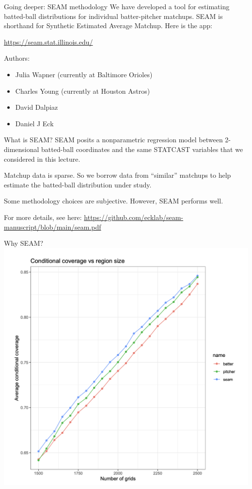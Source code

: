 \documentclass[
  ignorenonframetext,
]{beamer}
\providecommand{\tightlist}{%
  \setlength{\itemsep}{0pt}\setlength{\parskip}{0pt}}
\begin{document}
\begin{frame}{Going deeper: SEAM methodology}
\protect\hypertarget{going-deeper-seam-methodology}{}
We have developed a tool for estimating batted-ball distributions for
individual batter-pitcher matchups. SEAM is shorthand for Synthetic
Estimated Average Matchup. Here is the app:

\vspace{12pt}

\url{https://seam.stat.illinois.edu/}

\vspace{12pt}

Authors:

\begin{itemize}
\tightlist
\item
  Julia Wapner (currently at Baltimore Orioles)
\item
  Charles Young (currently at Houston Astros)
\item
  David Dalpiaz
\item
  Daniel J Eck
\end{itemize}
\end{frame}

\begin{frame}{What is SEAM?}
\protect\hypertarget{what-is-seam}{}
SEAM posits a nonparametric regression model between 2-dimensional
batted-ball coordinates and the same STATCAST variables that we
considered in this lecture.

\vspace{12pt}

Matchup data is sparse. So we borrow data from ``similar'' matchups to
help estimate the batted-ball distribution under study.

\vspace{12pt}

Some methodology choices are subjective. However, SEAM performs well.

\vspace{12pt}

For more details, see here:
\url{https://github.com/ecklab/seam-manuscript/blob/main/seam.pdf}
\end{frame}

\begin{frame}{Why SEAM?}
\protect\hypertarget{why-seam}{}
\includegraphics{seam_coverage.png}
\end{frame}
\end{document}
